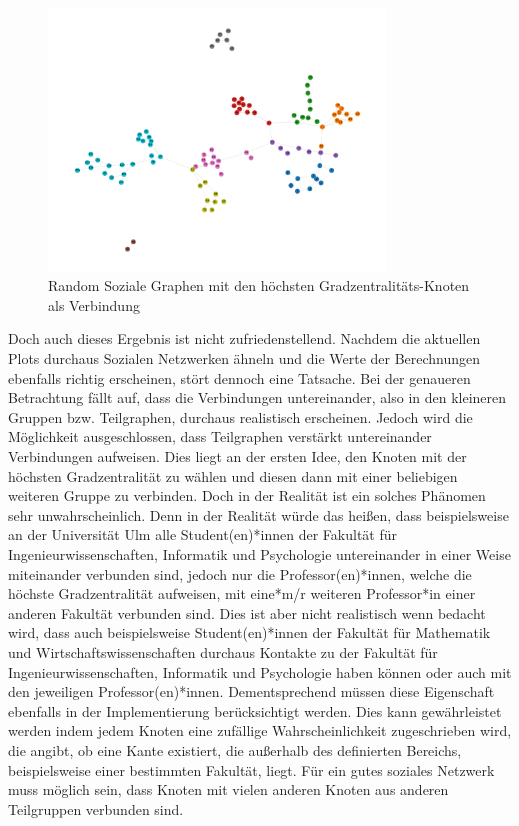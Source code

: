 \FloatBarrier
\begin{figure}[h!]
    \centering
    \hspace*{-1.5cm}
    \includegraphics[width=0.8\textwidth]{Graphics/NearSocialNetwork.png}
    \caption{Random Soziale Graphen mit den höchsten Gradzentralitäts-Knoten als Verbindung }
    \label{NearSozialerGraph}
\end{figure}

Doch auch dieses Ergebnis ist nicht zufriedenstellend.
Nachdem die aktuellen Plots durchaus Sozialen Netzwerken ähneln und die Werte der Berechnungen ebenfalls richtig erscheinen, stört dennoch eine Tatsache. Bei der genaueren Betrachtung fällt auf, dass die Verbindungen untereinander, also in den kleineren Gruppen bzw. Teilgraphen, durchaus realistisch erscheinen. Jedoch wird die Möglichkeit ausgeschlossen, dass Teilgraphen verstärkt untereinander Verbindungen aufweisen. Dies liegt an der ersten Idee, den Knoten mit der höchsten Gradzentralität zu wählen und diesen dann mit einer beliebigen weiteren Gruppe zu verbinden. Doch in der Realität ist ein solches Phänomen sehr unwahrscheinlich. Denn in der Realität würde das heißen, dass beispielsweise an der Universität Ulm alle Student(en)*innen der Fakultät für Ingenieurwissenschaften, Informatik und Psychologie untereinander in einer Weise miteinander verbunden sind, jedoch nur die Professor(en)*innen, welche die höchste Gradzentralität aufweisen, mit eine*m/r weiteren Professor*in einer anderen Fakultät verbunden sind. Dies ist aber nicht realistisch wenn bedacht wird, dass auch beispielsweise Student(en)*innen der Fakultät für Mathematik und Wirtschaftswissenschaften durchaus Kontakte zu der Fakultät für Ingenieurwissenschaften, Informatik und Psychologie haben können oder auch mit den jeweiligen Professor(en)*innen. Dementsprechend müssen diese Eigenschaft ebenfalls in der Implementierung berücksichtigt werden. Dies kann gewährleistet werden indem jedem Knoten eine zufällige Wahrscheinlichkeit zugeschrieben wird, die angibt, ob eine Kante existiert, die außerhalb des definierten Bereichs, beispielsweise einer bestimmten Fakultät, liegt. Für ein gutes soziales Netzwerk muss möglich sein, dass Knoten mit vielen anderen Knoten aus anderen Teilgruppen verbunden sind. 

